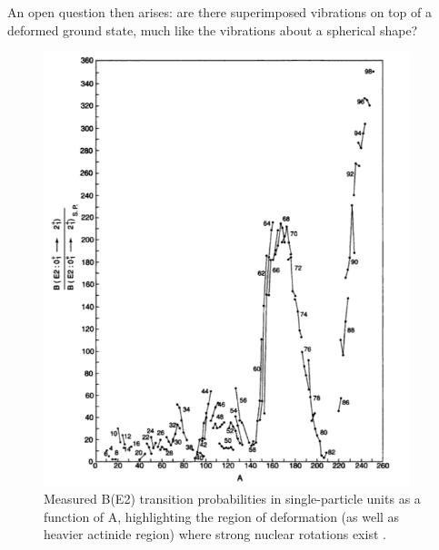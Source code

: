An open question then arises: are there superimposed vibrations on top of a deformed ground state, much like the vibrations about a spherical shape?

\begin{figure}[h!]
\centering
\includegraphics[width=0.95\textwidth]{figures/B(E2)_rotations_Casten.png}
\caption{Measured B(E2) transition probabilities in single-particle units as a function of A, highlighting the region of deformation (as well as heavier actinide region) where strong nuclear rotations exist \cite{Casten_text}. \label{fig:nucl_rotation}}
\end{figure}
\newpage




